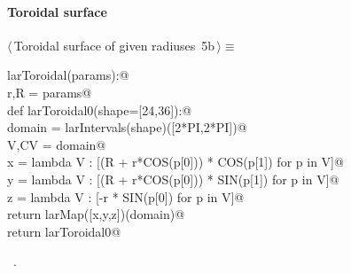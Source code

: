 \documentclass[11pt,oneside]{article}	%
\begin{document}
\paragraph{Toroidal surface}
\begin{flushleft} \small \label{scrap10}
\protect{}$\langle\,$Toroidal surface of given radiuses\nobreak\ {\footnotesize 5b}$\,\rangle\equiv$
\vspace{-1ex}
\begin{list}{}{} \item
\mbox{}\verb@def larToroidal(params):@\\
\mbox{}\verb@   r,R = params@\\
\mbox{}\verb@   def larToroidal0(shape=[24,36]):@\\
\mbox{}\verb@      domain = larIntervals(shape)([2*PI,2*PI])@\\
\mbox{}\verb@      V,CV = domain@\\
\mbox{}\verb@      x = lambda V : [(R + r*COS(p[0])) * COS(p[1]) for p in V]@\\
\mbox{}\verb@      y = lambda V : [(R + r*COS(p[0])) * SIN(p[1]) for p in V]@\\
\mbox{}\verb@      z = lambda V : [-r * SIN(p[0]) for p in V]@\\
\mbox{}\verb@      return larMap([x,y,z])(domain)@\\
\mbox{}\verb@   return larToroidal0@\\
\mbox{}\verb@@{\NWsep}
\end{list}
\vspace{-1ex}
\footnotesize\addtolength{\baselineskip}{-1ex}
\begin{list}{}{\setlength{\itemsep}{-\parsep}\setlength{\itemindent}{-\leftmargin}}
\item \NWtxtMacroRefIn\ .
\end{list}
\end{flushleft}
\end{document}
